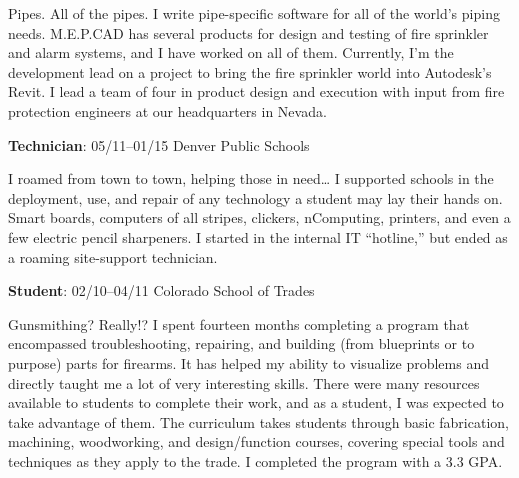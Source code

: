 \documentclass[letterpaper,12pt]{article}
\begin{document}
Pipes. All of the pipes. I write pipe-specific software for all of the world's
piping needs. M.E.P.CAD has several products for design and testing of fire
sprinkler and alarm systems, and I have worked on all of them. Currently, I'm
the development lead on a project to bring the fire sprinkler world into
Autodesk's Revit. I lead a team of four in product design and execution with
input from fire protection engineers at our headquarters in Nevada.

\begin{flushleft}
\textbf{Technician}: 05/11--01/15 Denver Public Schools
\end{flushleft}

I roamed from town to town, helping those in need\ldots{} I supported schools in
the deployment, use, and repair of any technology a student may lay their hands
on. Smart boards, computers of all stripes, clickers, nComputing, printers, and
even a few electric pencil sharpeners. I started in the internal IT ``hotline,''
but ended as a roaming site-support technician.

\begin{flushleft}
\textbf{Student}: 02/10--04/11 Colorado School of Trades
\end{flushleft}

Gunsmithing? Really!? I spent fourteen months completing a program that
encompassed troubleshooting, repairing, and building (from blueprints or to
purpose) parts for firearms. It has helped my ability to visualize problems
and directly taught me a lot of very interesting skills. There were many
resources available to students to complete their work, and as a student, I
was expected to take advantage of them. The curriculum takes students through
basic fabrication, machining, woodworking, and design/function courses,
covering special tools and techniques as they apply to the trade. I completed
the program with a 3.3 GPA.
\end{document}
